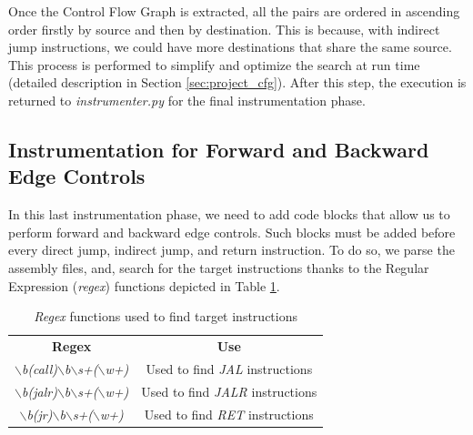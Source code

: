 Once the Control Flow Graph is extracted, all the pairs are ordered in ascending
order firstly by source and then by destination. This is because, with indirect
jump instructions, we could have more destinations that share the same source.
This process is performed to simplify and optimize the search at run time (detailed
description in Section \ref{sec:project_cfg}). After this step, the execution is
returned to \textit{instrumenter.py} for the final instrumentation phase.

\subsection{Instrumentation for Forward and Backward Edge Controls}
\label{subsec:project_instrcontrols}

In this last instrumentation phase, we need to add code blocks that allow us to perform
forward and backward edge controls. Such blocks must be added before every
direct jump, indirect jump, and return instruction. To do so, we parse the
assembly files, and, search for the target instructions thanks to the Regular
Expression (\textit{regex}) functions depicted in Table \ref{tab:regexes}.

\begin{table}
  \centering
  \begin{tabular}{|c|c|}
    \hline
    \textbf{Regex}                                                                      & \textbf{Use}                            \\
    \hhline{==} \textit{$\backslash$b(call)$\backslash$b$\backslash$s+($\backslash$w+)} & Used to find \textit{JAL} instructions  \\
    \hline
    \textit{$\backslash$b(jalr)$\backslash$b$\backslash$s+($\backslash$w+)}             & Used to find \textit{JALR} instructions \\
    \hline
    \textit{$\backslash$b(jr)$\backslash$b$\backslash$s+($\backslash$w+)}               & Used to find \textit{RET} instructions  \\
    \hline
  \end{tabular}
  \caption{\textit{Regex} functions used to find target instructions}
  \label{tab:regexes}
\end{table}

